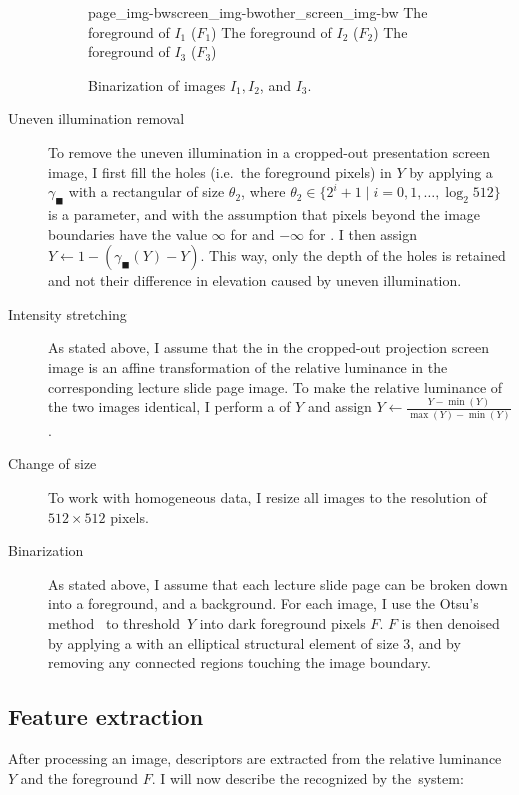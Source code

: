 \begin{description}
\begin{figure}
    \kern\floatsep
      {page_img-bw}{screen_img-bw}{other_screen_img-bw}%
      {The foreground of $I_1$ ($F_1$)}%
      {The foreground of $I_2$ ($F_2$)}%
      {The foreground of $I_3$ ($F_3$)}
    \caption{Binarization of images $I_1,I_2$, and $I_3$.}
    \label{fig:preprocessing-last}
  \end{figure}
  \item[Uneven illumination removal]
    To remove the uneven illumination in a cropped-out presentation screen
    image, I first fill the holes (i.e.\ the foreground pixels) in $Y$ by
    applying a  $\gamma_\blacksquare$ with a
    rectangular  of size $\theta_2$, where
    $\theta_2\in\{2^i+1\mid i=0,1,\ldots,\log_2 512\}$
    is a parameter, and with the assumption that pixels beyond the image
    boundaries have the value $\infty$ for  and
    $-\infty$ for . I then assign $Y\leftarrow
    1-(\gamma_\blacksquare(Y)-Y)$.  This way, only the depth of the holes is retained and
    not their difference in elevation caused by uneven illumination.
  \item[Intensity stretching]
    As stated above, I assume that the  in the
    cropped-out projection screen image is an affine transformation of the
    relative luminance in the corresponding lecture slide page image. To make
    the relative luminance of the two images identical, I perform a
     of $Y$ and assign
    $Y\leftarrow\frac{Y-\min(Y)}{\max(Y)-\min(Y)}$.
  \item[Change of size]
    To work with homogeneous data, I resize all images to the resolution of
    $512\times 512$ pixels.
  \item[Binarization]
    As stated above, I assume that each lecture slide page can be broken down
    into a foreground, and a background. For each image, I use
    the Otsu's method~\cite{otsu1979threshold} to threshold~$Y$ into dark
    foreground pixels $F$. $F$ is then denoised by applying a
     with an elliptical
    structural element of size 3, and by removing any connected regions
    touching the image boundary.
\end{description}

\subsection{Feature extraction}
\label{sec:features}
After processing an image, descriptors are extracted from the
relative luminance $Y$ and the foreground $F$. I will now describe the
 recognized by the~system:

